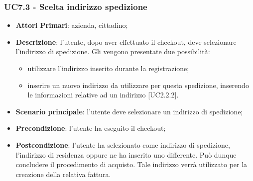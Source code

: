 \subsubsection{UC7.3 - Scelta indirizzo spedizione}
\begin{itemize}
	\item \textbf{Attori Primari}: azienda, cittadino;
	\item \textbf{Descrizione}:
	l'utente, dopo aver effettuato il checkout, deve selezionare l'indirizzo di spedizione. Gli vengono presentate due possibilità:
	\begin{itemize}
		\item utilizzare l'indirizzo inserito durante la registrazione;
		\item inserire un nuovo indirizzo da utilizzare per questa spedizione, inserendo le informazioni relative ad un indirizzo [UC2.2.2].
	\end{itemize}
	\item \textbf{Scenario principale}: l'utente deve selezionare un indirizzo di spedizione;
	\item \textbf{Precondizione}: l'utente ha eseguito il checkout;
	\item \textbf{Postcondizione}:
	l'utente ha selezionato come indirizzo di spedizione, l'indirizzo di 
	residenza oppure ne ha inserito uno differente. Può dunque concludere il 
	procedimento di acquisto. Tale indirizzo verrà utilizzato per la creazione 
	della relativa fattura.
\end{itemize}

